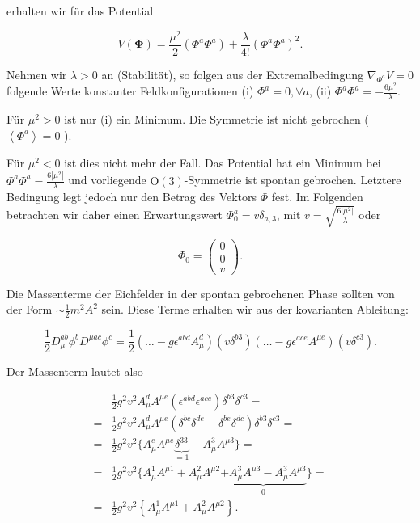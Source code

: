 \documentclass[10pt, letterpaper]{article}
\begin{document}
erhalten wir für das Potential

$$
V(\boldsymbol{\Phi})=\frac{\mu^2}{2}\left(\Phi^a \Phi^a\right)+\frac{\lambda}{4!}\left(\Phi^a \Phi^a\right)^2 .
$$


Nehmen wir $\lambda>0$ an (Stabilität), so folgen aus der Extremalbedingung $\nabla_{\Phi^a} V=0$ folgende Werte konstanter Feldkonfigurationen
(i) $\Phi^a=0, \forall a$,
(ii) $\Phi^a \Phi^a=-\frac{6 \mu^2}{\lambda}$.

Für $\mu^2>0$ ist nur (i) ein Minimum. Die Symmetrie ist nicht gebrochen ( $\left\langle\Phi^a\right\rangle=0$ ). 

Für $\mu^2<0$ ist dies nicht mehr der Fall. Das Potential hat ein Minimum bei $\Phi^a \Phi^a=\frac{6\left|\mu^2\right|}{\lambda}$ und vorliegende $\mathrm{O}(3)$-Symmetrie ist spontan gebrochen. Letztere Bedingung legt jedoch nur den Betrag des Vektors $\Phi$ fest. Im Folgenden betrachten wir daher einen Erwartungswert $\Phi_0^a=v \delta_{a, 3}$, mit $v=\sqrt{\frac{6\left|\mu^2\right|}{\lambda}}$ oder

$$
\Phi_0=\left(\begin{array}{l}
0 \\
0 \\
v
\end{array}\right) .
$$


Die Massenterme der Eichfelder in der spontan gebrochenen Phase sollten von der Form $\sim \frac{1}{2} m^2 A^2$ sein. Diese Terme erhalten wir aus der kovarianten Ableitung:

$$
\frac{1}{2} D_\mu^{a b} \phi^b D^{\mu a c} \phi^c=\frac{1}{2}\left(\ldots-g \epsilon^{a b d} A_\mu^d\right)\left(v \delta^{b 3}\right)\left(\ldots-g \epsilon^{a c e} A^{\mu e}\right)\left(v \delta^{c 3}\right) .
$$


Der Massenterm lautet also

$$
\begin{aligned}
& \frac{1}{2} g^2 v^2 A_\mu^d A^{\mu e}\left(\epsilon^{a b d} \epsilon^{a c e}\right) \delta^{b 3} \delta^{c 3}= \\
= & \frac{1}{2} g^2 v^2 A_\mu^d A^{\mu e}\left(\delta^{b c} \delta^{d e}-\delta^{b e} \delta^{d c}\right) \delta^{b 3} \delta^{c 3}= \\
= & \frac{1}{2} g^2 v^2\{A_\mu^e A^{\mu e} \underbrace{\delta^{33}}_{=1}-A_\mu^3 A^{\mu 3}\}= \\
= & \frac{1}{2} g^2 v^2\{A_\mu^1 A^{\mu 1}+A_\mu^2 A^{\mu 2} \underbrace{+A_\mu^3 A^{\mu 3}-A_\mu^3 A^{\mu 3}}_0\}= \\
= & \frac{1}{2} g^2 v^2\left\{A_\mu^1 A^{\mu 1}+A_\mu^2 A^{\mu 2}\right\} .
\end{aligned}
$$
\end{document}
